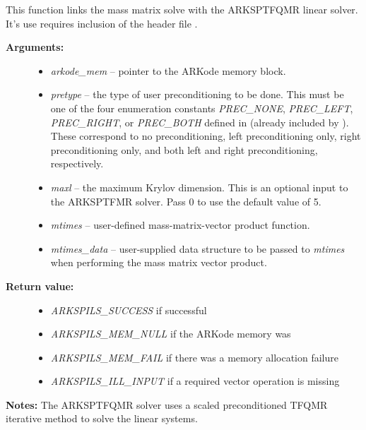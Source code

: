 \documentclass[letterpaper,10pt,english]{sphinxmanual}
\begin{document}

\begin{fulllineitems}
\label{c_interface/User_callable:c.ARKMassSptfqmr}
This function links the mass matrix solve with the ARKSPTFQMR
linear solver.  It's use requires inclusion of the header file
.
\begin{description}
\item[{\textbf{Arguments:}}] \leavevmode\begin{itemize}
\item {} 
\emph{arkode\_mem} -- pointer to the ARKode memory block.

\item {} 
\emph{pretype} -- the type of user preconditioning to be done.  This
must be one of the four enumeration constants \emph{PREC\_NONE},
\emph{PREC\_LEFT}, \emph{PREC\_RIGHT}, or \emph{PREC\_BOTH} defined in
 (already included by
). These correspond to no preconditioning,
left preconditioning only, right preconditioning only, and
both left and right preconditioning, respectively.

\item {} 
\emph{maxl} -- the maximum Krylov dimension. This is an optional input
to the ARKSPTFMR solver. Pass 0 to use the default value of 5.

\item {} 
\emph{mtimes} -- user-defined mass-matrix-vector product function.

\item {} 
\emph{mtimes\_data} -- user-supplied data structure to be passed
to \emph{mtimes} when performing the mass matrix vector product.

\end{itemize}

\item[{\textbf{Return value:}}] \leavevmode\begin{itemize}
\item {} 
\emph{ARKSPILS\_SUCCESS} if successful

\item {} 
\emph{ARKSPILS\_MEM\_NULL}  if the ARKode memory was 

\item {} 
\emph{ARKSPILS\_MEM\_FAIL}  if there was a memory allocation failure

\item {} 
\emph{ARKSPILS\_ILL\_INPUT} if a required vector operation is missing

\end{itemize}

\end{description}

\textbf{Notes:} The ARKSPTFQMR solver uses a scaled preconditioned TFQMR
iterative method to solve the linear systems.

\end{fulllineitems}
\end{document}

